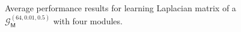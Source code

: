 \begin{figure}[!htb]
\begin{subfigure}[b]{0.47\textwidth}
    \end{subfigure}
    \caption{Average performance results for learning Laplacian matrix of a $\mathcal{G}^{(64, 0.01, 0.5)}_{\mathsf{M}}$
    with four modules.}
    \label{fig:performance-modular}
\end{figure}

